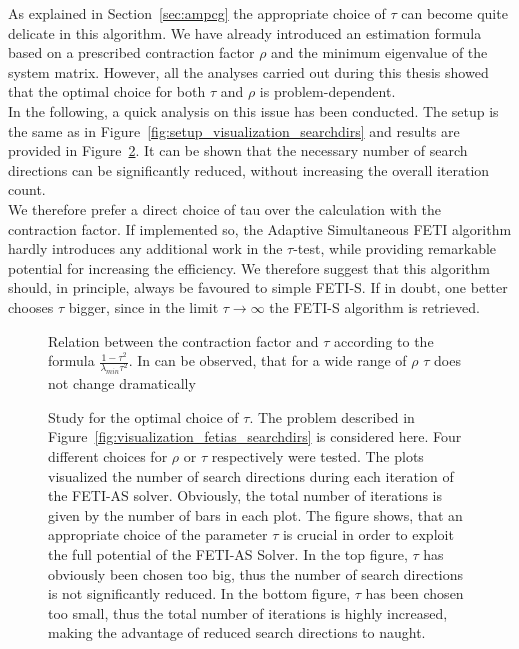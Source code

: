 As explained in Section~\ref{sec:ampcg} the appropriate choice of $\tau$ can become quite delicate in this algorithm. We have already introduced an estimation formula based on a prescribed contraction factor $\rho$ and the minimum eigenvalue of the system matrix. However, all the analyses carried out during this thesis showed that the optimal choice for both $\tau$ and $\rho$ is problem-dependent.\\
In the following, a quick analysis on this issue has been conducted. The setup is the same as in Figure~\ref{fig:setup_visualization_searchdirs} and results are provided in Figure~\ref{fig:results_study_contractfac}. It can be shown that the necessary number of search directions can be significantly reduced, without increasing the overall iteration count.\\
We therefore prefer a direct choice of tau over the calculation with the contraction factor. If implemented so, the Adaptive Simultaneous FETI algorithm hardly introduces any additional work in the $\tau$-test, while providing remarkable potential for increasing the efficiency. We therefore suggest that this algorithm should, in principle, always be favoured to simple FETI-S. If in doubt, one better chooses $\tau$ bigger, since in the limit $\tau \rightarrow \infty$ the FETI-S algorithm is retrieved.


\begin{figure}[ht]
  \begin{center}
    
    \caption[Visualization $\tau$-$\rho$ relation]{Relation between the contraction factor and $\tau$ according to the formula $\frac{1-\tau^2}{\lambda_{min} \tau^2}$. In can be observed, that for a wide range of $\rho$ $\tau$ does not change dramatically}
    \label{fig:fetias_tau_formula}
  \end{center}
\end{figure}


\begin{figure}[ht]
  \begin{center}
    
    \caption[Choice of $\tau$ - problem 1]{Study for the optimal choice of $\tau$. The problem described in Figure~\ref{fig:visualization_fetias_searchdirs} is considered here. Four different choices for $\rho$ or $\tau$ respectively were tested. The plots visualized the number of search directions during each iteration of the FETI-AS solver. Obviously, the total number of iterations is given by the number of bars in each plot. The figure shows, that an appropriate choice of the parameter $\tau$ is crucial in order to exploit the full potential of the FETI-AS Solver. In the top figure, $\tau$ has obviously been chosen too big, thus the number of search directions is not significantly reduced. In the bottom figure, $\tau$ has been chosen too small, thus the total number of iterations is highly increased, making the advantage of reduced search directions to naught.}
    \label{fig:results_study_contractfac}
  \end{center}
\end{figure}


